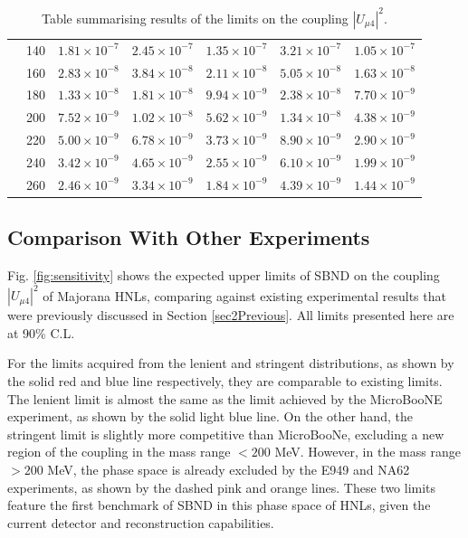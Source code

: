 \begin{table}[htbp!]
\begin{center}
\begin{tabular}{|c| c | c | c | c | c | c|}
& 140 & $1.81\times10^{-7}$ & $2.45\times10^{-7}$ & $1.35\times10^{-7}$ & $3.21\times10^{-7}$ & $1.05\times10^{-7}$ \\
& 160 & $2.83\times10^{-8}$ & $3.84\times10^{-8}$ & $2.11\times10^{-8}$ & $5.05\times10^{-8}$ & $1.63\times10^{-8}$ \\
& 180 & $1.33\times10^{-8}$ & $1.81\times10^{-8}$ & $9.94\times10^{-9}$ & $2.38\times10^{-8}$ & $7.70\times10^{-9}$ \\
& 200 & $7.52\times10^{-9}$ & $1.02\times10^{-8}$ & $5.62\times10^{-9}$ & $1.34\times10^{-8}$ & $4.38\times10^{-9}$ \\
& 220 & $5.00\times10^{-9}$ & $6.78\times10^{-9}$ & $3.73\times10^{-9}$ & $8.90\times10^{-9}$ & $2.90\times10^{-9}$ \\
& 240 & $3.42\times10^{-9}$ & $4.65\times10^{-9}$ & $2.55\times10^{-9}$ & $6.10\times10^{-9}$ & $1.99\times10^{-9}$ \\
& 260 & $2.46\times10^{-9}$ & $3.34\times10^{-9}$ & $1.84\times10^{-9}$ & $4.39\times10^{-9}$ & $1.44\times10^{-9}$ \\ [0.5ex]
\hline
\end{tabular}
\end{center}
\caption{Table summarising results of the limits on the coupling $|U_{\mu4}|^2$.}
\label{table:result}
\end{table}

\subsection{Comparison With Other Experiments}

Fig. \ref{fig:sensitivity} shows the expected upper limits of SBND on the coupling $|U_{\mu4}|^2$ of Majorana HNLs, comparing against existing experimental results that were previously discussed in Section \ref{sec2Previous}.
All limits presented here are at 90\% C.L.

For the limits acquired from the lenient and stringent distributions, as shown by the solid red and blue line respectively, they are comparable to existing limits.
The lenient limit is almost the same as the limit achieved by the MicroBooNE experiment, as shown by the solid light blue line.
On the other hand, the stringent limit is slightly more competitive than MicroBooNe, excluding a new region of the coupling in the mass range $< 200$ MeV.
However, in the mass range $> 200$ MeV, the phase space is already excluded by the E949 and NA62 experiments, as shown by the dashed pink and orange lines.
These two limits feature the first benchmark of SBND in this phase space of HNLs, given the current detector and reconstruction capabilities.

